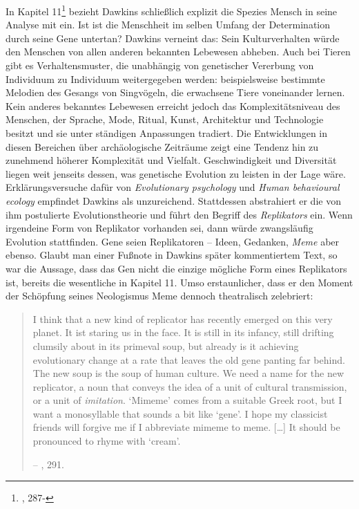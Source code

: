 \documentclass[openany,twoside,twocolumn]{book}
\let\rmarkdownfootnote\footnote%
\def\footnote{\protect\rmarkdownfootnote}
\begin{document}
In Kapitel 11\footnote{\textcite{Dawkinsselfishgene40th2016}, 287-}
bezieht Dawkins schließlich explizit die Spezies Mensch in seine Analyse
mit ein. Ist ist die Menschheit im selben Umfang der Determination durch
seine Gene untertan? Dawkins verneint das: Sein Kulturverhalten würde
den Menschen von allen anderen bekannten Lebewesen abheben. Auch bei
Tieren gibt es Verhaltensmuster, die unabhängig von genetischer
Vererbung von Individuum zu Individuum weitergegeben werden:
beispielsweise bestimmte Melodien des Gesangs von Singvögeln, die
erwachsene Tiere voneinander lernen. Kein anderes bekanntes Lebewesen
erreicht jedoch das Komplexitätsniveau des Menschen, der Sprache, Mode,
Ritual, Kunst, Architektur und Technologie besitzt und sie unter
ständigen Anpassungen tradiert. Die Entwicklungen in diesen Bereichen
über archäologische Zeiträume zeigt eine Tendenz hin zu zunehmend
höherer Komplexität und Vielfalt. Geschwindigkeit und Diversität liegen
weit jenseits dessen, was genetische Evolution zu leisten in der Lage
wäre. Erklärungsversuche dafür von \emph{Evolutionary psychology} und
\emph{Human behavioural ecology} empfindet Dawkins als unzureichend.
Stattdessen abstrahiert er die von ihm postulierte Evolutionstheorie und
führt den Begriff des \emph{Replikators} ein. Wenn irgendeine Form von
Replikator vorhanden sei, dann würde zwangsläufig Evolution stattfinden.
Gene seien Replikatoren -- Ideen, Gedanken, \emph{Meme} aber ebenso.
Glaubt man einer Fußnote in Dawkins später kommentiertem Text, so war
die Aussage, dass das Gen nicht die einzige mögliche Form eines
Replikators ist, bereits die wesentliche in Kapitel 11. Umso
erstaunlicher, dass er den Moment der Schöpfung seines Neologismus Meme
dennoch theatralisch zelebriert:

\begin{quote}
I think that a new kind of replicator has recently emerged on this very
planet. It ist staring us in the face. It is still in its infancy, still
drifting clumsily about in its primeval soup, but already is it
achieving evolutionary change at a rate that leaves the old gene panting
far behind. The new soup is the soup of human culture. We need a name
for the new replicator, a noun that conveys the idea of a unit of
cultural transmission, or a unit of \emph{imitation}. `Mimeme' comes
from a suitable Greek root, but I want a monosyllable that sounds a bit
like `gene'. I hope my classicist friends will forgive me if I
abbreviate mimeme to meme. {[}\ldots{}{]} It should be pronounced to
rhyme with `cream'.

-- \textcite{Dawkinsselfishgene40th2016}, 291.
\end{quote}
\end{document}
